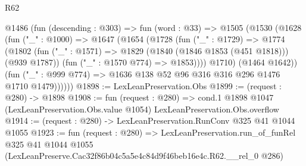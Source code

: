 \begin{lexlean}{R62}
\begin{coremodule}
      @1486
        (fun (descending : @303) =>
        fun (word : @33) =>
        @1505
          (@1530
            (@1628
              (fun ("_" : @1000) =>
              @1647
                (@1654
                  (@1728
                    (fun ("_" : @1729) =>
                    @1774
                      (@1802
                        (fun ("_" : @1571) => @1829 (@1840 (@1846 @1853 (@451 @1818))) (@939 @1787))
                        (fun ("_" : @1570 @774) => @1853))))
                  @1710)
                (@1464 @1642))
              (fun ("_" : @999 @774) => @1636 @138 @52 @96 @316 @316 @296 @1476 @1710 @1479))))))
@1898 := LexLeanPreservation.Obs
@1899 := (request : @280) -> @1898
@1908 := fun (request : @280) =>
  cond.{1} @1898 @1047 (LexLeanPreservation.Obs.value @1054) LexLeanPreservation.Obs.overflow
@1914 := (request : @280) -> LexLeanPreservation.RunConv @325 @41 @1044 @1055
@1923 := fun (request : @280) =>
  LexLeanPreservation.run_of_funRel
    @325
    @41
    @1044
    @1055
    (LexLeanPreserve.Cac32f86b04c5a5e4c84d9f46beb16e4c.R62.__rel_0 @286)
\end{coremodule}
\end{lexlean}
